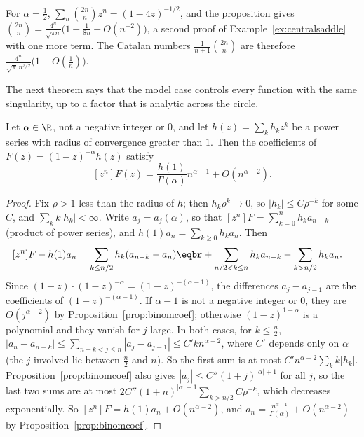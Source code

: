 For $\alpha=\frac12$, $\sum_n\binom{2n}nz^n=(1-4z)^{-1/2}$, and the proposition gives $\binom{2n}n=\frac{4^n}{\sqrt{\pi n}}\bigl(1-\frac1{8n}+O(n^{-2})\bigr)$, a second proof of
Example~\ref{ex:centralsaddle} with one more term. The Catalan numbers $\frac1{n+1}\binom{2n}n$ are therefore $\frac{4^n}{\sqrt\pi\,n^{3/2}}\bigl(1+O(\frac1n)\bigr)$.

The next theorem says that the model case controls every function with the same singularity, up to a factor that is analytic across the circle.

\begin{theorem}[transfer]\label{thm:transfer}
Let $\alpha\in\R$, not a negative integer or $0$, and let $h(z)=\sum_kh_kz^k$ be a power series with radius of convergence greater than $1$. Then the
coefficients of $F(z)=(1-z)^{-\alpha}h(z)$ satisfy
\[
[z^n]F(z)=\frac{h(1)}{\Gamma(\alpha)}n^{\alpha-1}+O(n^{\alpha-2}).
\]
\end{theorem}

\begin{proof}
Fix $\rho>1$ less than the radius of $h$; then $h_k\rho^k\to0$, so $|h_k|\le C\rho^{-k}$ for some $C$, and $\sum_kk|h_k|<\infty$. Write $a_j=a_j(\alpha)$, so that
$[z^n]F=\sum_{k=0}^nh_ka_{n-k}$ (product of power series), and $h(1)a_n=\sum_{k\ge0}h_ka_n$. Then
\[
\begin{aligned}{}[z^n]F-h(1)a_n&=\sum_{k\le n/2}h_k(a_{n-k}-a_n)\eqbr+\sum_{n/2<k\le n}h_ka_{n-k}-\sum_{k>n/2}h_ka_n.\end{aligned}
\]
Since $(1-z)\cdot(1-z)^{-\alpha}=(1-z)^{-(\alpha-1)}$, the differences $a_j-a_{j-1}$ are the coefficients of $(1-z)^{-(\alpha-1)}$. If $\alpha-1$ is not a negative integer or $0$, they are
$O(j^{\alpha-2})$ by Proposition~\ref{prop:binomcoef}; otherwise $(1-z)^{1-\alpha}$ is a polynomial and they vanish for $j$ large. In both cases, for $k\le\frac n2$,
$|a_n-a_{n-k}|\le\sum_{n-k<j\le n}|a_j-a_{j-1}|\le C'kn^{\alpha-2}$, where $C'$ depends only on $\alpha$ (the $j$ involved lie between $\frac n2$ and $n$). So the first sum is
at most $C'n^{\alpha-2}\sum_kk|h_k|$. Proposition~\ref{prop:binomcoef} also gives $|a_j|\le C''(1+j)^{|\alpha|+1}$ for all $j$, so the last two sums are at most
$2C''(1+n)^{|\alpha|+1}\sum_{k>n/2}C\rho^{-k}$, which decreases exponentially. So $[z^n]F=h(1)a_n+O(n^{\alpha-2})$, and
$a_n=\frac{n^{\alpha-1}}{\Gamma(\alpha)}+O(n^{\alpha-2})$ by Proposition~\ref{prop:binomcoef}.
\end{proof}

